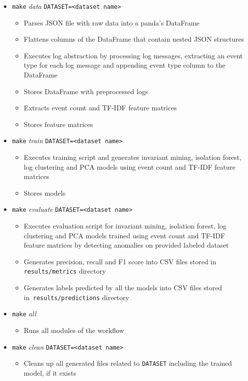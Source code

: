  \begin{itemize}
     \item \texttt{make} \textit{data} \texttt{DATASET=<dataset name>}
     \begin{itemize}
         \item Parses JSON file with raw data into a panda's DataFrame
         \item Flattens columns of the DataFrame that contain nested JSON structures
         \item Executes log abstraction by processing log messages, extracting an event type for each log message and appending event type column to the DataFrame
         \item Stores DataFrame with preprocessed logs 
         \item Extracts event count and TF-IDF feature matrices
         \item Stores feature matrices
     \end{itemize}
     \item \texttt{make} \textit{train} \texttt{DATASET=<dataset name>}
     \begin{itemize}
         \item Executes training script and generates invariant mining, isolation forest, log clustering and PCA models using event count and TF-IDF feature matrices
         \item Stores models
     \end{itemize}
     \item \texttt{make} \textit{evaluate} \texttt{DATASET=<dataset name>}
     \begin{itemize}
         \item Executes evaluation script for invariant mining, isolation forest, log clustering and PCA models trained using event count and TF-IDF feature matrices by detecting anomalies on provided labeled dataset
         \item Generates precision, recall and F1 score into CSV files stored in \texttt{\justify results/metrics} directory
         \item Generates labels predicted by all the models into CSV files stored in~\texttt{results/predictions} directory
     \end{itemize}
     \item \texttt{make} \textit{all} 
     \begin{itemize}
         \item Runs all modules of the workflow
     \end{itemize}
     \item \texttt{make} \textit{clean} \texttt{DATASET=<dataset name>}
     \begin{itemize}
         \item Cleans up all generated files related to \texttt{DATASET} including the trained model, if it exists
     \end{itemize}
 \end{itemize}
 
